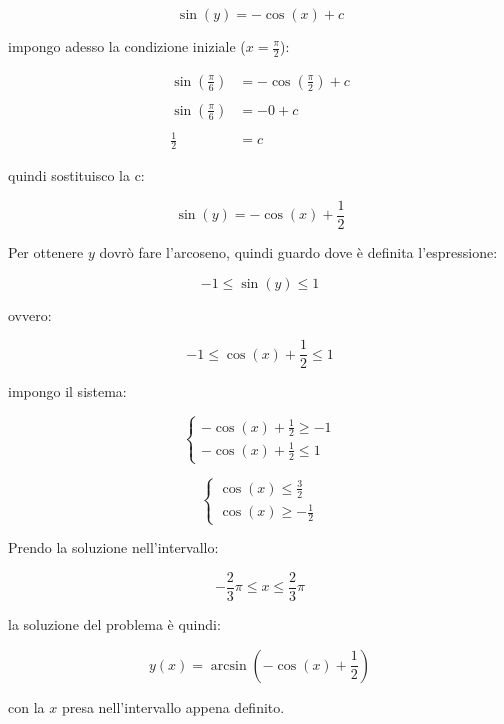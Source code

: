 \[
    \sin(y) = -\cos(x) +c
\]

impongo adesso la condizione iniziale (\(x=\frac{\pi}{2}\)):

\begin{align*}
    \sin\left(\frac{\pi}{6}\right) & = -\cos\left(\frac{\pi}{2}\right) + c \\ \\
    \sin\left(\frac{\pi}{6}\right) & = -0 +c                               \\ \\
    \frac{1}{2}                    & = c
\end{align*}

quindi sostituisco la c:

\[
    \sin\left(y\right) = - \cos(x) + \frac{1}{2}
\]

Per ottenere \(y\) dovrò fare l'arcoseno, quindi guardo dove è definita l'espressione:

\[
    -1 \le \sin\left(y\right) \le 1
\]

ovvero:

\[
    -1 \le \cos(x) + \frac{1}{2} \le 1
\]

impongo il sistema:

\begin{equation*}
    \begin{cases*}
        -\cos(x) +\frac{1}{2}\ge -1 \\
        -\cos(x) + \frac{1}{2} \le 1
    \end{cases*}
\end{equation*}

\begin{equation*}
    \begin{cases*}
        \cos(x) \le  \frac{3}{2} \\
        \cos(x) \ge -\frac{1}{2}
    \end{cases*}
\end{equation*}

Prendo la soluzione nell'intervallo:

\[
    -\frac{2}{3}\pi \le  x \le  \frac{2}{3}\pi
\]

la soluzione del problema è quindi:

\[
    y(x) = \arcsin \left( -\cos(x) +\frac{1}{2} \right)
\]

con la \(x\) presa nell'intervallo appena definito.
